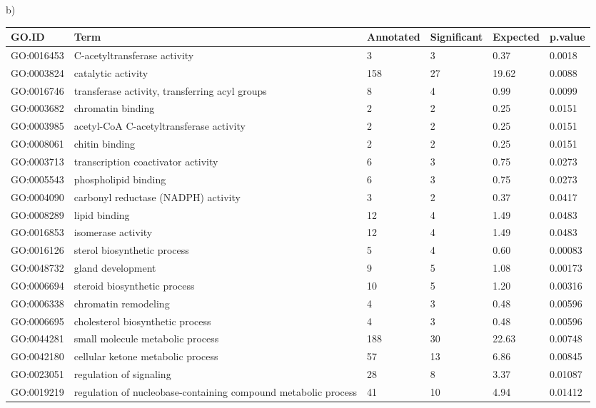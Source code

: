 \documentclass[10pt]{bmc_article}
\newenvironment{bmcformat}{\begin{raggedright}\baselineskip20pt\sloppy\setboolean{publ}{false}}{\end{raggedright}\baselineskip20pt\sloppy}
\begin{document}
\begin{bmcformat}
b)\\

\begin{longtable}{lp{4.5cm}llll}
 GO.ID & Term & Annotated & Significant & Expected & p.value \\ 
  \hline
GO:0016453 & C-acetyltransferase activity &   3 &   3 & 0.37 & 0.0018 \\ 
  GO:0003824 & catalytic activity & 158 &  27 & 19.62 & 0.0088 \\ 
  GO:0016746 & transferase activity, transferring acyl groups &   8 &   4 & 0.99 & 0.0099 \\ 
  GO:0003682 & chromatin binding &   2 &   2 & 0.25 & 0.0151 \\ 
  GO:0003985 & acetyl-CoA C-acetyltransferase activity &   2 &   2 & 0.25 & 0.0151 \\ 
  GO:0008061 & chitin binding &   2 &   2 & 0.25 & 0.0151 \\ 
  GO:0003713 & transcription coactivator activity &   6 &   3 & 0.75 & 0.0273 \\ 
  GO:0005543 & phospholipid binding &   6 &   3 & 0.75 & 0.0273 \\ 
  GO:0004090 & carbonyl reductase (NADPH) activity &   3 &   2 & 0.37 & 0.0417 \\ 
  GO:0008289 & lipid binding &  12 &   4 & 1.49 & 0.0483 \\ 
  GO:0016853 & isomerase activity &  12 &   4 & 1.49 & 0.0483 \\ 
   \hline
GO:0016126 & sterol biosynthetic process &   5 &   4 & 0.60 & 0.00083 \\ 
  GO:0048732 & gland development &   9 &   5 & 1.08 & 0.00173 \\ 
  GO:0006694 & steroid biosynthetic process &  10 &   5 & 1.20 & 0.00316 \\ 
  GO:0006338 & chromatin remodeling &   4 &   3 & 0.48 & 0.00596 \\ 
  GO:0006695 & cholesterol biosynthetic process &   4 &   3 & 0.48 & 0.00596 \\ 
  GO:0044281 & small molecule metabolic process & 188 &  30 & 22.63 & 0.00748 \\ 
  GO:0042180 & cellular ketone metabolic process &  57 &  13 & 6.86 & 0.00845 \\ 
  GO:0023051 & regulation of signaling &  28 &   8 & 3.37 & 0.01087 \\ 
  GO:0019219 & regulation of nucleobase-containing compound metabolic process &  41 &  10 & 4.94 & 0.01412 \\ 

\end{longtable}
\end{bmcformat}
\end{document}
